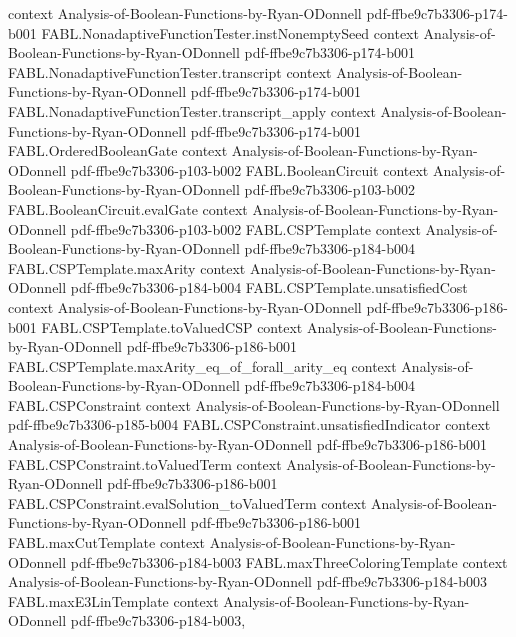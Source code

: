 \begin{theorem}
  {context}
  {Analysis-of-Boolean-Functions-by-Ryan-ODonnell}
  {pdf-ffbe9c7b3306-p174-b001}
\proofstep
  {FABL.NonadaptiveFunctionTester.instNonemptySeed}
  {context}
  {Analysis-of-Boolean-Functions-by-Ryan-ODonnell}
  {pdf-ffbe9c7b3306-p174-b001}
\proofstep
  {FABL.NonadaptiveFunctionTester.transcript}
  {context}
  {Analysis-of-Boolean-Functions-by-Ryan-ODonnell}
  {pdf-ffbe9c7b3306-p174-b001}
\proofstep
  {FABL.NonadaptiveFunctionTester.transcript_apply}
  {context}
  {Analysis-of-Boolean-Functions-by-Ryan-ODonnell}
  {pdf-ffbe9c7b3306-p174-b001}
\proofstep
  {FABL.OrderedBooleanGate}
  {context}
  {Analysis-of-Boolean-Functions-by-Ryan-ODonnell}
  {pdf-ffbe9c7b3306-p103-b002}
\proofstep
  {FABL.BooleanCircuit}
  {context}
  {Analysis-of-Boolean-Functions-by-Ryan-ODonnell}
  {pdf-ffbe9c7b3306-p103-b002}
\proofstep
  {FABL.BooleanCircuit.evalGate}
  {context}
  {Analysis-of-Boolean-Functions-by-Ryan-ODonnell}
  {pdf-ffbe9c7b3306-p103-b002}
\proofstep
  {FABL.CSPTemplate}
  {context}
  {Analysis-of-Boolean-Functions-by-Ryan-ODonnell}
  {pdf-ffbe9c7b3306-p184-b004}
\proofstep
  {FABL.CSPTemplate.maxArity}
  {context}
  {Analysis-of-Boolean-Functions-by-Ryan-ODonnell}
  {pdf-ffbe9c7b3306-p184-b004}
\proofstep
  {FABL.CSPTemplate.unsatisfiedCost}
  {context}
  {Analysis-of-Boolean-Functions-by-Ryan-ODonnell}
  {pdf-ffbe9c7b3306-p186-b001}
\proofstep
  {FABL.CSPTemplate.toValuedCSP}
  {context}
  {Analysis-of-Boolean-Functions-by-Ryan-ODonnell}
  {pdf-ffbe9c7b3306-p186-b001}
\proofstep
  {FABL.CSPTemplate.maxArity_eq_of_forall_arity_eq}
  {context}
  {Analysis-of-Boolean-Functions-by-Ryan-ODonnell}
  {pdf-ffbe9c7b3306-p184-b004}
\proofstep
  {FABL.CSPConstraint}
  {context}
  {Analysis-of-Boolean-Functions-by-Ryan-ODonnell}
  {pdf-ffbe9c7b3306-p185-b004}
\proofstep
  {FABL.CSPConstraint.unsatisfiedIndicator}
  {context}
  {Analysis-of-Boolean-Functions-by-Ryan-ODonnell}
  {pdf-ffbe9c7b3306-p186-b001}
\proofstep
  {FABL.CSPConstraint.toValuedTerm}
  {context}
  {Analysis-of-Boolean-Functions-by-Ryan-ODonnell}
  {pdf-ffbe9c7b3306-p186-b001}
\proofstep
  {FABL.CSPConstraint.evalSolution_toValuedTerm}
  {context}
  {Analysis-of-Boolean-Functions-by-Ryan-ODonnell}
  {pdf-ffbe9c7b3306-p186-b001}
\proofstep
  {FABL.maxCutTemplate}
  {context}
  {Analysis-of-Boolean-Functions-by-Ryan-ODonnell}
  {pdf-ffbe9c7b3306-p184-b003}
\proofstep
  {FABL.maxThreeColoringTemplate}
  {context}
  {Analysis-of-Boolean-Functions-by-Ryan-ODonnell}
  {pdf-ffbe9c7b3306-p184-b003}
\proofstep
  {FABL.maxE3LinTemplate}
  {context}
  {Analysis-of-Boolean-Functions-by-Ryan-ODonnell}
  {pdf-ffbe9c7b3306-p184-b003,
}
\end{theorem}
